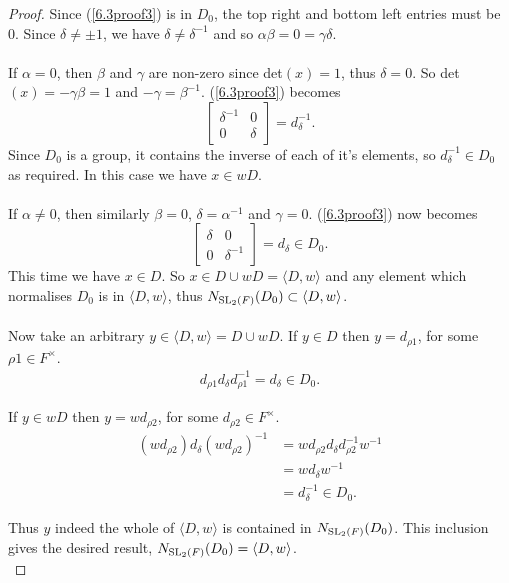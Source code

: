 \begin{proof}
    Since (\ref{6.3proof3}) is in $D_0$, the top right and bottom left entries must be 0. Since  $\delta \neq \pm 1$, we have $\delta \neq \delta^{-1}$ and so $\alpha \beta = 0 = \gamma \delta$. \\
    \\
     \space If $\alpha = 0$, then $\beta$ and $\gamma$ are non-zero since det$(x) = 1$, thus $\delta = 0$. So det$(x) = - \gamma \beta = 1$  and $- \gamma = \beta^{-1}$. (\ref{6.3proof3}) becomes $$\begin{bmatrix} \delta^{-1} & 0 \\ 0 & \delta \end{bmatrix} = d^{-1}_\delta.$$Since $D_0$ is a group, it contains the inverse of each of it's elements, so $d^{-1}_\delta \in D_0$ as required. In this case we have $x \in wD$. \\
    \\
     \space If $\alpha \neq 0$, then similarly $\beta = 0$, $\delta = \alpha^{-1}$ and $\gamma = 0$. (\ref{6.3proof3}) now becomes $$\begin{bmatrix} \delta & 0 \\ 0 & \delta^{-1} \end{bmatrix} = d_\delta \in D_0.$$This time we have $x \in D$. So $x \in D \cup wD = \langle D , w \rangle$ and any element which normalises $D_0$ is in $\langle D , w \rangle$, thus $N_{\operatorname{SL}_2(F)}(D_0) \subset \langle D , w \rangle$. \\
    \\
    Now take an arbitrary $y \in \langle D , w \rangle = D \cup wD$. If $y \in D$ then $y = d_{\rho 1}$, for some $\rho 1 \in F^\times$.
    \begin{align*} d_{\rho 1} d_\delta d^{-1}_{\rho 1} = d_\delta \in D_0.
    \end{align*}
    
    If $y \in wD$ then $y = w d_{\rho 2}$, for some $ d_{\rho 2} \in F^\times$.
    \begin{align*} (w d_{\rho 2}) d_\delta (w d_{\rho 2})^{-1} &= w d_{\rho 2} d_\delta d^{-1}_{\rho 2} w^{-1}
    \\ &= w d_\delta w^{-1}
    \\ &= d^{-1}_\delta \in D_0.
    \end{align*}
    
    Thus $y$ indeed the whole of $\langle D , w \rangle$ is contained in $N_{\operatorname{SL}_2(F)}(D_0)$. This inclusion gives the desired result, $N_{\operatorname{SL}_2(F)}(D_0) = \langle D , w \rangle$. \\
    
\end{proof}


